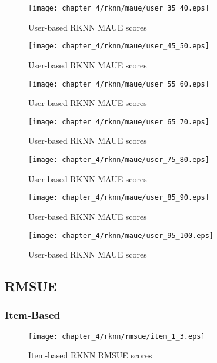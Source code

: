 \begin{figure}[H]
\centering
\texttt{[image: chapter\_4/rknn/maue/user\_35\_40.eps]}
\caption{User-based RKNN MAUE scores}
\end{figure}

\begin{figure}[H]
\centering
\texttt{[image: chapter\_4/rknn/maue/user\_45\_50.eps]}
\caption{User-based RKNN MAUE scores}
\end{figure}

\begin{figure}[H]
\centering
\texttt{[image: chapter\_4/rknn/maue/user\_55\_60.eps]}
\caption{User-based RKNN MAUE scores}
\end{figure}

\begin{figure}[H]
\centering
\texttt{[image: chapter\_4/rknn/maue/user\_65\_70.eps]}
\caption{User-based RKNN MAUE scores}
\end{figure}

\begin{figure}[H]
\centering
\texttt{[image: chapter\_4/rknn/maue/user\_75\_80.eps]}
\caption{User-based RKNN MAUE scores}
\end{figure}

\begin{figure}[H]
\centering
\texttt{[image: chapter\_4/rknn/maue/user\_85\_90.eps]}
\caption{User-based RKNN MAUE scores}
\end{figure}

\begin{figure}[H]
\centering
\texttt{[image: chapter\_4/rknn/maue/user\_95\_100.eps]}
\caption{User-based RKNN MAUE scores}
\end{figure}

\subsection{RMSUE}

\subsubsection{Item-Based}

\begin{figure}[H]
\centering
\texttt{[image: chapter\_4/rknn/rmsue/item\_1\_3.eps]}
\caption{Item-based RKNN RMSUE scores}
\end{figure}

